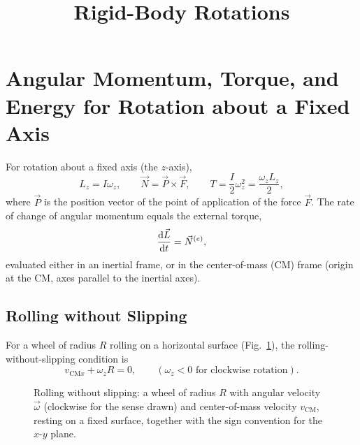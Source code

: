 \documentclass[11pt]{article}
\title{Rigid-Body Rotations}
\author{}
\date{}
\begin{document}
\maketitle
\vspace{-2.5em}

\section{Angular Momentum, Torque, and Energy for Rotation about a Fixed Axis}

For rotation about a fixed axis (the $z$-axis),
\begin{equation}
L_z = I\omega_z, \qquad \vec N = \vec P\times\vec F, \qquad T = \frac{I}{2}\omega_z^2 = \frac{\omega_z L_z}{2},
\label{eq:elem-1}
\end{equation}
where $\vec P$ is the position vector of the point of application of the force $\vec F$. The rate of change of angular momentum equals the external torque,
\begin{equation}
\frac{\mathrm{d} \vec L}{\mathrm{d} t} = \vec N^{(e)},
\label{eq:dLdt-Ne}
\end{equation}
evaluated either in an inertial frame, or in the center-of-mass (CM) frame (origin at the CM, axes parallel to the inertial axes).

\subsection{Rolling without Slipping}

For a wheel of radius $R$ rolling on a horizontal surface (Fig.~\ref{fig:rolling}), the rolling-without-slipping condition is
\begin{equation}
v_{\mathrm{CM}x} + \omega_z R = 0, \qquad (\omega_z<0 \text{ for clockwise rotation}).
\label{eq:rolling}
\end{equation}

\begin{figure}[htb]
\centering
{}
\hspace{1.3cm}
\caption{Rolling without slipping: a wheel of radius $R$ with angular velocity $\vec\omega$ (clockwise for the sense drawn) and center-of-mass velocity $v_{\mathrm{CM}}$, resting on a fixed surface, together with the sign convention for the $x$-$y$ plane.}
\label{fig:rolling}
\end{figure}
\end{document}
